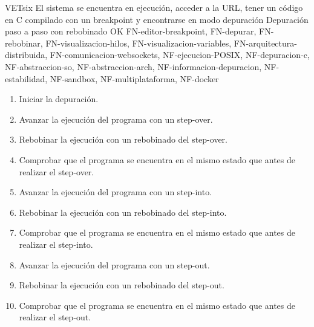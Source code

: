     \begin{testCase}{VET}{six}
        {El sistema se encuentra en ejecución, acceder a la URL, tener un código en C compilado con un breakpoint y encontrarse en modo depuración}
        {\NA}
        {Depuración paso a paso con rebobinado}
        {OK}
        {FN-editor-breakpoint, FN-depurar, FN-rebobinar, FN-visualizacion-hilos, FN-visualizacion-variables, FN-arquitectura-distribuida, FN-comunicacion-websockets, NF-ejecucion-POSIX, NF-depuracion-c, NF-abstraccion-so, NF-abstraccion-arch, NF-informacion-depuracion, NF-estabilidad, NF-sandbox, NF-multiplataforma, NF-docker}
        \begin{enumerate}
            \item Iniciar la depuración.
            \item Avanzar la ejecución del programa con un step-over.
            \item Rebobinar la ejecución con un rebobinado del step-over.
            \item Comprobar que el programa se encuentra en el mismo estado que antes de realizar el step-over.
            \item Avanzar la ejecución del programa con un step-into.
            \item Rebobinar la ejecución con un rebobinado del step-into.
            \item Comprobar que el programa se encuentra en el mismo estado que antes de realizar el step-into.
            \item Avanzar la ejecución del programa con un step-out.
            \item Rebobinar la ejecución con un rebobinado del step-out.
            \item Comprobar que el programa se encuentra en el mismo estado que antes de realizar el step-out.
        \end{enumerate}
    \end{testCase}
    
